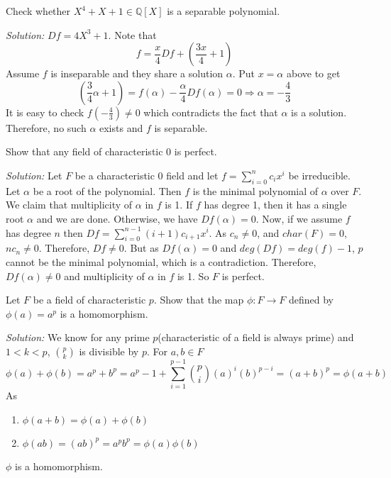 \documentclass[a4paper, 11pt]{article}
\newenvironment{solution}
    {\textit{Solution:}}
    {}
\begin{document}
\begin{tcolorbox}[colback=c2,colframe=c1,title=Problem 3.1]
    Check whether $X^4 + X + 1 \in\mathbb Q[X]$ is a separable polynomial.
\end{tcolorbox}
\begin{solution}
    $Df=4X^3+1$. Note that
    $$f=\frac{x}{4}Df+\left(\frac{3x}{4}+1\right)$$
    Assume $f$ is inseparable and they share a solution $\alpha$. Put $x=\alpha$ above to get 
    $$\left(\frac{3}{4}\alpha+1\right)=f(\alpha)-\frac{\alpha}{4}Df(\alpha)=0\Rightarrow \alpha=-\frac{4}{3}$$
    It is easy to check $f\left(-\frac{4}{3}\right)\ne0$ which contradicts the fact that $\alpha$ is a solution. Therefore, no such $\alpha$ exists and $f$ is separable. 
\end{solution}



\begin{tcolorbox}[colback=c2,colframe=c1,title=Problem 3.2]
    Show that any field of characteristic 0 is perfect.
\end{tcolorbox}
\begin{solution}
    Let $F$ be a characteristic 0 field and let $f=\sum_{i=0}^nc_ix^i$ be irreducible. Let $\alpha$ be a root of the polynomial. Then $f$ is the minimal polynomial of $\alpha$ over $F$. We claim that multiplicity of $\alpha$ in $f$ is 1. If $f$ has degree 1, then it has a single root $\alpha$ and we are done. Otherwise, we have $Df(\alpha)=0$. Now, if we assume $f$ has degree $n$ then $Df =\sum_{i=0}^{n-1}(i+1)c_{i+1}x^i$. As $c_n\ne 0$, and $char(F)=0$, $nc_n\ne0$. Therefore, $Df\ne0$. But as $Df(\alpha)=0$ and  $deg(Df)=deg(f)-1$, $p$ cannot be the minimal polynomial, which is a contradiction. Therefore, $Df(\alpha)\ne0$ and multiplicity of $\alpha$ in $f$ is 1. So $F$ is perfect.
\end{solution}


\begin{tcolorbox}[colback=c2,colframe=c1,title=Problem 3.3]
    Let $F$ be a field of characteristic $p$. Show that the map $\phi : F \to F$ defined by
$\phi(a) = a^p$
is a homomorphism.
\end{tcolorbox}
\begin{solution}
    We know for any prime $p$(characteristic of a field is always prime) and $1<k<p$, $p\choose k$ is divisible by $p$. 
    For $a,b\in F$
    $$\phi(a)+\phi(b)=a^{p}+b^p=a^{p}-1+\sum_{i=1}^{p-1}{p\choose i}\left(a\right)^i(b)^{p-i}=(a+b)^p=\phi(a+b)$$
    As
    \begin{enumerate}
        \item $\phi(a+b)=\phi(a)+\phi(b)$
        \item $\phi(ab)=(ab)^p=a^pb^p=\phi(a)\phi(b)$
    \end{enumerate}
    $\phi$ is a homomorphism.
\end{solution}
\end{document}
